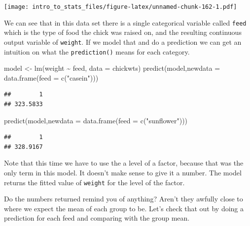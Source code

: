 \documentclass[
]{book}
\newenvironment{Shaded}{\begin{snugshade}}{\end{snugshade}}
\newcommand{\AttributeTok}[1]{\textcolor[rgb]{0.77,0.63,0.00}{#1}}
\newcommand{\CommentTok}[1]{\textcolor[rgb]{0.56,0.35,0.01}{\textit{#1}}}
\newcommand{\FunctionTok}[1]{\textcolor[rgb]{0.00,0.00,0.00}{#1}}
\newcommand{\NormalTok}[1]{#1}
\newcommand{\OtherTok}[1]{\textcolor[rgb]{0.56,0.35,0.01}{#1}}
\newcommand{\SpecialCharTok}[1]{\textcolor[rgb]{0.00,0.00,0.00}{#1}}
\newcommand{\StringTok}[1]{\textcolor[rgb]{0.31,0.60,0.02}{#1}}
\begin{document}
\texttt{[image: intro\_to\_stats\_files/figure-latex/unnamed-chunk-162-1.pdf]}

We can see that in this data set there is a single categorical variable called \texttt{feed} which is the type of food the chick was raised on, and the resulting continuous output variable of \texttt{weight}. If we model that and do a prediction we can get an intuition on what the \texttt{prediction()} means for each category.

\begin{Shaded}
\begin{Highlighting}[]
\NormalTok{model }\OtherTok{\textless{}{-}} \FunctionTok{lm}\NormalTok{(weight }\SpecialCharTok{\textasciitilde{}}\NormalTok{ feed, }\AttributeTok{data =}\NormalTok{ chickwts)}
\FunctionTok{predict}\NormalTok{(model,}\AttributeTok{newdata =} \FunctionTok{data.frame}\NormalTok{(}\AttributeTok{feed =} \FunctionTok{c}\NormalTok{(}\StringTok{"casein"}\NormalTok{)))}
\end{Highlighting}
\end{Shaded}

\begin{verbatim}
##        1 
## 323.5833
\end{verbatim}

\begin{Shaded}
\begin{Highlighting}[]
\FunctionTok{predict}\NormalTok{(model,}\AttributeTok{newdata =} \FunctionTok{data.frame}\NormalTok{(}\AttributeTok{feed =} \FunctionTok{c}\NormalTok{(}\StringTok{"sunflower"}\NormalTok{)))}
\end{Highlighting}
\end{Shaded}

\begin{verbatim}
##        1 
## 328.9167
\end{verbatim}

Note that this time we have to use the a level of a factor, because that was the only term in this model. It doesn't make sense to give it a number. The model returns the fitted value of \texttt{weight} for the level of the factor.

Do the numbers returned remind you of anything? Aren't they awfully close to where we expect the mean of each group to be. Let's check that out by doing a prediction for each feed and comparing with the group mean.

\begin{Shaded}
\end{Shaded}
\end{document}
